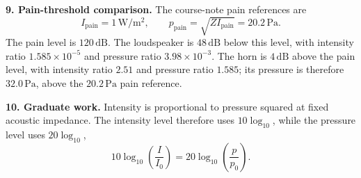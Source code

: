 \textbf{9. Pain-threshold comparison.} The course-note pain references are
\[
\boxed{I_{\mathrm{pain}}=1\,\mathrm{W/m^2},\qquad
p_{\mathrm{pain}}=\sqrt{ZI_{\mathrm{pain}}}=20.2\,\mathrm{Pa}.}
\]
The pain level is $120\,\mathrm{dB}$. The loudspeaker is $48\,\mathrm{dB}$ below this level, with intensity ratio $1.585\times10^{-5}$ and pressure ratio $3.98\times10^{-3}$. The horn is $4\,\mathrm{dB}$ above the pain level, with intensity ratio $2.51$ and pressure ratio $1.585$; its pressure is therefore $32.0\,\mathrm{Pa}$, above the $20.2\,\mathrm{Pa}$ pain reference.

\textbf{10. Graduate work.} Intensity is proportional to pressure squared at fixed acoustic impedance. The intensity level therefore uses $10\log_{10}$, while the pressure level uses $20\log_{10}$,
\[
10\log_{10}\left(\frac{I}{I_0}\right)
=20\log_{10}\left(\frac{p}{p_0}\right).
\]

\clearpage
{}

\endgroup
